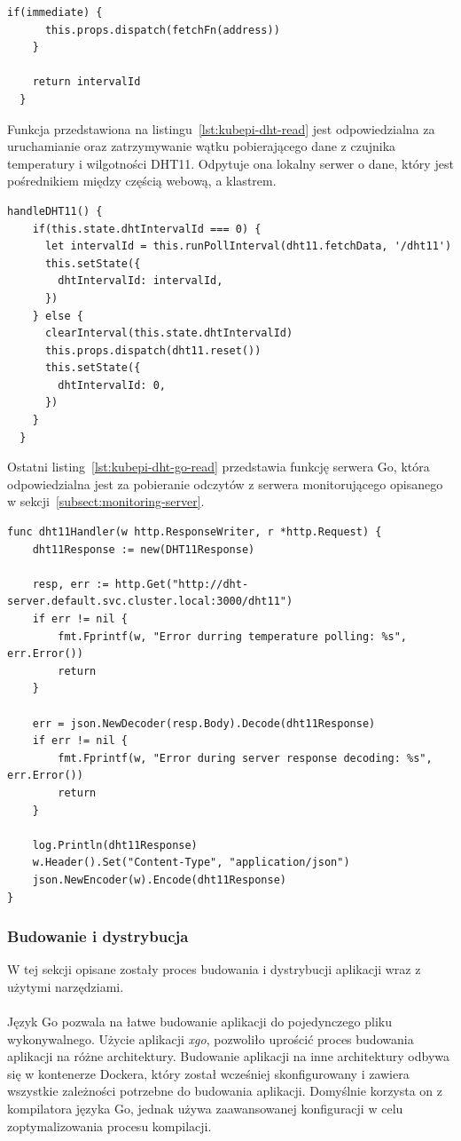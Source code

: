 \documentclass[12pt]{report}
\let\Oldsubsubsection\subsubsection
\renewcommand{\subsubsection}{\FloatBarrier\Oldsubsubsection}
\begin{document}
{\begin{lstlisting}[language=golang,caption=Startowanie wątków do odczytu danych,label=lst:kubepi-fetch]
    if(immediate) {
      this.props.dispatch(fetchFn(address))
    }

    return intervalId
  }
\end{lstlisting}

\noindent Funkcja przedstawiona na listingu~\ref{lst:kubepi-dht-read} jest odpowiedzialna za uruchamianie oraz zatrzymywanie wątku pobierającego dane z czujnika temperatury i wilgotności DHT11. Odpytuje ona lokalny serwer o dane, który jest pośrednikiem między częścią webową, a klastrem.
\begin{lstlisting}[language=golang,caption=Startowanie wątku odpytującego nasz serwer o dane z sensora DHT11,label=lst:kubepi-dht-read]
  handleDHT11() {
    if(this.state.dhtIntervalId === 0) {
      let intervalId = this.runPollInterval(dht11.fetchData, '/dht11')
      this.setState({
        dhtIntervalId: intervalId,
      })
    } else {
      clearInterval(this.state.dhtIntervalId)
      this.props.dispatch(dht11.reset())
      this.setState({
        dhtIntervalId: 0,
      })
    }
  }
\end{lstlisting}

\noindent Ostatni listing~\ref{lst:kubepi-dht-go-read} przedstawia funkcję serwera Go, która odpowiedzialna jest za pobieranie odczytów z serwera monitorującego opisanego w sekcji~\ref{subsect:monitoring-server}.
\begin{lstlisting}[language=golang,caption=Odczyt temperatury z naszego serwera,label=lst:kubepi-dht-go-read]
func dht11Handler(w http.ResponseWriter, r *http.Request) {
	dht11Response := new(DHT11Response)

	resp, err := http.Get("http://dht-server.default.svc.cluster.local:3000/dht11")
	if err != nil {
		fmt.Fprintf(w, "Error durring temperature polling: %s", err.Error())
		return
	}

	err = json.NewDecoder(resp.Body).Decode(dht11Response)
	if err != nil {
		fmt.Fprintf(w, "Error during server response decoding: %s", err.Error())
		return
	}

	log.Println(dht11Response)
	w.Header().Set("Content-Type", "application/json")
	json.NewEncoder(w).Encode(dht11Response)
}
\end{lstlisting}

\newpage
\subsubsection{Budowanie i dystrybucja}
W tej sekcji opisane zostały proces budowania i dystrybucji aplikacji wraz z użytymi narzędziami. \\ \\
Język Go pozwala na łatwe budowanie aplikacji do pojedynczego pliku wykonywalnego. Użycie aplikacji \textit{xgo}, pozwoliło uprościć proces budowania aplikacji na różne architektury. Budowanie aplikacji na inne architektury odbywa się w kontenerze Dockera, który został wcześniej skonfigurowany i zawiera wszystkie zależności potrzebne do budowania aplikacji. Domyślnie korzysta on z kompilatora języka Go, jednak używa zaawansowanej konfiguracji w celu zoptymalizowania procesu kompilacji. \\

}
\end{document}
